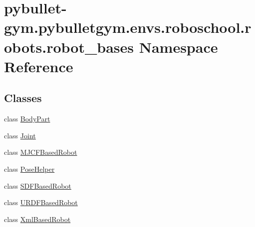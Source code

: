 \hypertarget{namespacepybullet-gym_1_1pybulletgym_1_1envs_1_1roboschool_1_1robots_1_1robot__bases}{}\section{pybullet-\/gym.pybulletgym.\+envs.\+roboschool.\+robots.\+robot\+\_\+bases Namespace Reference}
\label{namespacepybullet-gym_1_1pybulletgym_1_1envs_1_1roboschool_1_1robots_1_1robot__bases}
\subsection*{Classes}
\begin{DoxyCompactItemize}
\item 
class \hyperlink{classpybullet-gym_1_1pybulletgym_1_1envs_1_1roboschool_1_1robots_1_1robot__bases_1_1_body_part}{Body\+Part}
\item 
class \hyperlink{classpybullet-gym_1_1pybulletgym_1_1envs_1_1roboschool_1_1robots_1_1robot__bases_1_1_joint}{Joint}
\item 
class \hyperlink{classpybullet-gym_1_1pybulletgym_1_1envs_1_1roboschool_1_1robots_1_1robot__bases_1_1_m_j_c_f_based_robot}{M\+J\+C\+F\+Based\+Robot}
\item 
class \hyperlink{classpybullet-gym_1_1pybulletgym_1_1envs_1_1roboschool_1_1robots_1_1robot__bases_1_1_pose_helper}{Pose\+Helper}
\item 
class \hyperlink{classpybullet-gym_1_1pybulletgym_1_1envs_1_1roboschool_1_1robots_1_1robot__bases_1_1_s_d_f_based_robot}{S\+D\+F\+Based\+Robot}
\item 
class \hyperlink{classpybullet-gym_1_1pybulletgym_1_1envs_1_1roboschool_1_1robots_1_1robot__bases_1_1_u_r_d_f_based_robot}{U\+R\+D\+F\+Based\+Robot}
\item 
class \hyperlink{classpybullet-gym_1_1pybulletgym_1_1envs_1_1roboschool_1_1robots_1_1robot__bases_1_1_xml_based_robot}{Xml\+Based\+Robot}
\end{DoxyCompactItemize}
